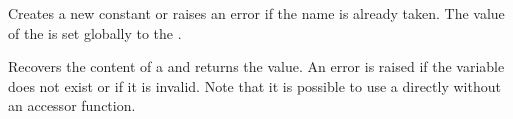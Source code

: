 \documentclass[oneside]{book}
\begin{document}
\begin{function}{\tlConst}
\begin{syntax}
  
\end{syntax}
Creates a new constant  or raises an error
if the name is already taken. The value of the
 is set globally to the .
\begin{codehigh}
\tlConst {}
\end{codehigh}
\end{function}

\begin{function}{\tlUse}
\begin{syntax}
 
\end{syntax}
Recovers the content of a  and returns the value.
An error is raised if the variable
does not exist or if it is invalid. Note that it is possible to use
a  directly without an accessor function.
\begin{codehigh}
\tlUse \lTmpbTl
\end{codehigh}
\end{function}
\end{document}
